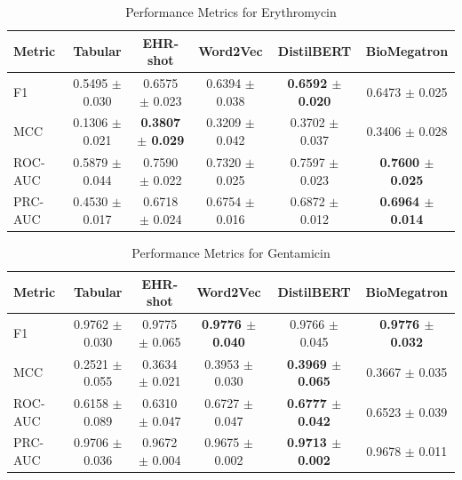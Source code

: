 \documentclass{article}
\theoremstyle{plain}
\theoremstyle{definition}
\theoremstyle{remark}
\begin{document}

\begin{table}[h!]
\caption{Performance Metrics for Erythromycin}
\label{table-erythromycin}
\vskip 0.15in
\begin{center}
\begin{small}
\begin{sc}
\begin{adjustbox}{width=5in}
\begin{tabular}{l| ccccc}
\toprule
Metric & Tabular & EHR-shot & Word2Vec & DistilBERT & BioMegatron \\
\midrule
F1 & 0.5495 $\pm$ 0.030 & 0.6575 $\pm$ 0.023 & 0.6394 $\pm$ 0.038 & \textbf{0.6592 $\pm$ 0.020} & 0.6473 $\pm$ 0.025 \\
MCC & 0.1306 $\pm$ 0.021 & \textbf{0.3807 $\pm$ 0.029} & 0.3209 $\pm$ 0.042 & 0.3702 $\pm$ 0.037 & 0.3406 $\pm$ 0.028 \\
ROC-AUC & 0.5879 $\pm$ 0.044 & 0.7590 $\pm$ 0.022 & 0.7320 $\pm$ 0.025 & 0.7597 $\pm$ 0.023 & \textbf{0.7600 $\pm$ 0.025} \\
PRC-AUC & 0.4530 $\pm$ 0.017 & 0.6718 $\pm$ 0.024 & 0.6754 $\pm$ 0.016 & 0.6872 $\pm$ 0.012 & \textbf{0.6964 $\pm$ 0.014} \\
\bottomrule
\end{tabular}
\end{adjustbox}
\end{sc}
\end{small}
\end{center}
\vskip -0.1in
\end{table}


\begin{table}[h!]
\caption{Performance Metrics for Gentamicin}
\label{table-gentamicin}
\vskip 0.15in
\begin{center}
\begin{small}
\begin{sc}
\begin{adjustbox}{width=5in}
\begin{tabular}{l| ccccc}
\toprule
Metric & Tabular & EHR-shot & Word2Vec & DistilBERT & BioMegatron \\
\midrule
F1 & 0.9762 $\pm$ 0.030 & 0.9775 $\pm$ 0.065 & \textbf{0.9776 $\pm$ 0.040} & 0.9766 $\pm$ 0.045 & \textbf{0.9776 $\pm$ 0.032} \\
MCC & 0.2521 $\pm$ 0.055 & 0.3634 $\pm$ 0.021 & 0.3953 $\pm$ 0.030 & \textbf{0.3969 $\pm$ 0.065} & 0.3667 $\pm$ 0.035 \\
ROC-AUC & 0.6158 $\pm$ 0.089 & 0.6310 $\pm$ 0.047 & 0.6727 $\pm$ 0.047 & \textbf{0.6777 $\pm$ 0.042} & 0.6523 $\pm$ 0.039 \\
PRC-AUC & 0.9706 $\pm$ 0.036 & 0.9672 $\pm$ 0.004 & 0.9675 $\pm$ 0.002 & \textbf{0.9713 $\pm$ 0.002} & 0.9678 $\pm$ 0.011 \\
\bottomrule
\end{tabular}
\end{adjustbox}
\end{sc}
\end{small}
\end{center}
\vskip -0.1in
\end{table}
\end{document}
